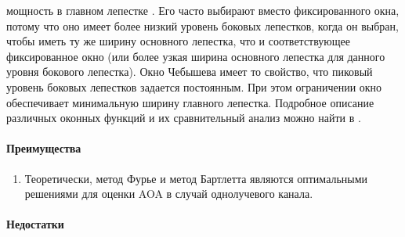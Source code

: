 мощность в главном лепестке \cite{Stoica2005}.  Его часто выбирают вместо
фиксированного окна, потому что оно имеет более низкий уровень
боковых лепестков, когда он выбран, чтобы иметь ту же ширину основного
лепестка, что и соответствующее фиксированное окно (или более узкая ширина
основного лепестка для данного уровня бокового лепестка).  Окно Чебышева имеет
то свойство, что пиковый уровень боковых лепестков задается
постоянным.  При этом ограничении окно обеспечивает минимальную ширину главного
лепестка. Подробное описание различных оконных функций и их сравнительный анализ можно найти
в \cite{Stoica2005} \cite{Allen2006}. 

\paragraph{Преимущества}%
\begin{enumerate}
    \item Теоретически, метод Фурье и метод Бартлетта являются оптимальными
        решениями для оценки AOA в
    случай однолучевого канала.
\end{enumerate}

\paragraph{Недостатки}%

